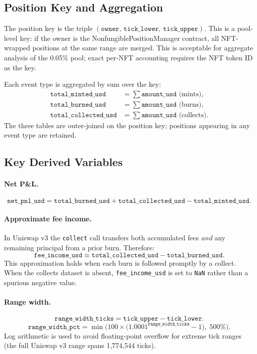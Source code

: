 \documentclass[11pt,a4paper]{article}
\begin{document}
\subsection{Position Key and Aggregation}

The position key is the triple $(\texttt{owner},\,\texttt{tick\_lower},\,
\texttt{tick\_upper})$. This is a pool-level key: if the owner is the
NonfungiblePositionManager contract, all NFT-wrapped positions at the
same range are merged. This is acceptable for aggregate analysis of
the 0.05\% pool; exact per-NFT accounting requires the NFT token ID
as the key.

Each event type is aggregated by sum over the key:
\begin{align*}
  \texttt{total\_minted\_usd}    &= \textstyle\sum \texttt{amount\_usd}
    \text{ (mints)}, \\
  \texttt{total\_burned\_usd}    &= \textstyle\sum \texttt{amount\_usd}
    \text{ (burns)}, \\
  \texttt{total\_collected\_usd} &= \textstyle\sum \texttt{amount\_usd}
    \text{ (collects)}.
\end{align*}
The three tables are outer-joined on the position key; positions appearing
in any event type are retained.

\subsection{Key Derived Variables}

\paragraph{Net P\&L.}
\[
  \texttt{net\_pnl\_usd} =
  \texttt{total\_burned\_usd} + \texttt{total\_collected\_usd}
  - \texttt{total\_minted\_usd}.
\]

\paragraph{Approximate fee income.}
In Uniswap v3 the \texttt{collect} call transfers both accumulated fees
\emph{and} any remaining principal from a prior burn. Therefore:
\[
  \texttt{fee\_income\_usd} \approx
  \texttt{total\_collected\_usd} - \texttt{total\_burned\_usd}.
\]
This approximation holds when each burn is followed promptly by a
collect. When the collects dataset is absent, \texttt{fee\_income\_usd}
is set to \texttt{NaN} rather than a spurious negative value.

\paragraph{Range width.}
\[
  \texttt{range\_width\_ticks} = \texttt{tick\_upper} - \texttt{tick\_lower}.
\]
\[
  \texttt{range\_width\_pct} = \min\!\Big(
  100 \times \big(1.0001^{\texttt{range\_width\_ticks}} - 1\big),\;
  500\%\Big).
\]
Log arithmetic is used to avoid floating-point overflow for extreme tick
ranges (the full Uniswap v3 range spans 1{,}774{,}544 ticks).
\end{document}
